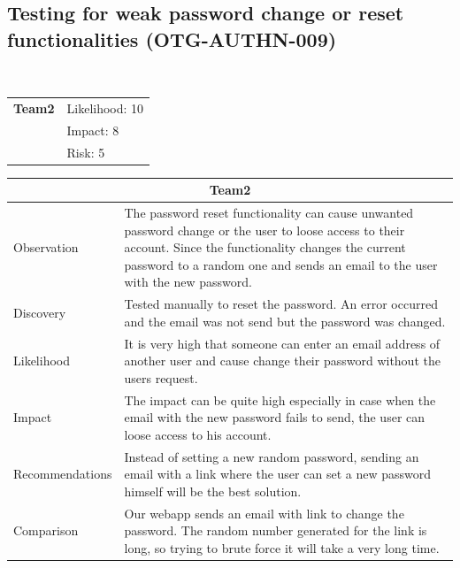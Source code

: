 \documentclass[headsepline,footsepline,footinclude=false,oneside,fontsize=11pt,paper=a4,listof=totoc,bibliography=totoc]{scrbook} %
\begin{document}
\pagebreak
\subsection{Testing for weak password change or reset functionalities (OTG-AUTHN-009)}\
\begin{tabular}{cR{12cm}}
	\textbf{Team2} & Likelihood: 10\\& Impact: 8\\& Risk: 5
\end{tabular}

\begin{tabular}{ l|p{11cm}  }
	\hline
	\multicolumn{2}{c}{\textbf{Team2}} \\
	\hline
	Observation & The password reset functionality can cause unwanted password change or the user to loose access to their account. Since the functionality changes the current password to a random one and sends an email to the user with the new password. \\
	Discovery & Tested manually to reset the password. An error occurred and the email was not send but the password was changed.\\
	Likelihood & It is very high that someone can enter an email address of another user and cause change their password without the users request.\\
	Impact & The impact can be quite high especially in case when the email with the new password fails to send, the user can loose access to his account.\\
	Recommendations & Instead of setting a new random password, sending an email with a link where the user can set a new password himself will be the best solution.\\
	Comparison & Our webapp  sends an email with link to change the password. The random number generated for the link is long, so trying to brute force it will take a very long time.\\ 
	\hline
\end{tabular}
\\
\vspace{0.5cm}
\\
\end{document}
